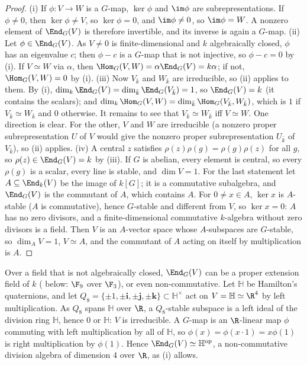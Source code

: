 \begin{proof}
(i) If $\phi\colon V\to W$ is a $G$-map, $\ker\phi$ and $\im\phi$ are subrepresentations. If $\phi\ne0$, then $\ker\phi\ne V$, so $\ker\phi=0$, and
$\im\phi\ne0$, so $\im\phi=W$. A nonzero element of $\End_G(V)$ is therefore invertible, and its inverse is again a $G$-map.
(ii) Let $\phi\in\End_G(V)$. As $V\ne0$ is finite-dimensional and $k$ algebraically closed, $\phi$ has an eigenvalue $c$; then $\phi-c$ is a
$G$-map that is not injective, so $\phi-c=0$ by (i). If $V\simeq W$ via $\alpha$, then $\Hom_G(V,W)=\alpha\End_G(V)=k\alpha$; if not, $\Hom_G(V,W)=0$
by (i).
(iii) Now $V_{\bar k}$ and $W_{\bar k}$ are irreducible, so (ii) applies to them. By (i),
$\dim_k\End_G(V)=\dim_{\bar k}\End_G(V_{\bar k})=1$, so $\End_G(V)=k$ (it contains the scalars); and $\dim_k\Hom_G(V,W)=\dim_{\bar k}\Hom_G(V_{\bar k},W_{\bar k})$, which
is $1$ if $V_{\bar k}\simeq W_{\bar k}$ and $0$ otherwise. It remains to see that $V_{\bar k}\simeq W_{\bar k}$ iff $V\simeq W$. One direction is clear. For the
other, $V$ and $W$ are irreducible (a nonzero proper subrepresentation $U$ of $V$ would give the nonzero proper subrepresentation $U_{\bar k}$
of $V_{\bar k}$), so (ii) applies.
(iv) A central $z$ satisfies $\rho(z)\rho(g)=\rho(g)\rho(z)$ for all $g$, so $\rho(z)\in\End_G(V)=k$ by (iii). If $G$ is abelian, every element is
central, so every $\rho(g)$ is a scalar, every line is stable, and $\dim V=1$. For the last statement let $A\subseteq\End_k(V)$ be the image of $k[G]$; it is a commutative subalgebra, and
$\End_G(V)$ is the commutant of $A$, which contains $A$. For $0\ne x\in A$, $\ker x$ is $A$-stable ($A$ is commutative), hence $G$-stable
and different from $V$, so $\ker x=0$: $A$ has no zero divisors, and a finite-dimensional commutative $k$-algebra without zero
divisors is a field. Then $V$ is an $A$-vector space whose $A$-subspaces are $G$-stable, so $\dim_AV=1$, $V\simeq A$, and the commutant
of $A$ acting on itself by multiplication is $A$.
\end{proof}

Over a field that is not algebraically closed, $\End_G(V)$ can be a proper extension field of $k$ ( below: $\F_9$ over
$\F_3$), or even non-commutative. Let $\mathbb H$ be Hamilton's quaternions, and let $Q_8=\{\pm1,\pm\mathbf i,\pm\mathbf j,\pm\mathbf k\}\subset\mathbb H^\times$ act on
$V=\mathbb H\simeq\R^4$ by left multiplication. As $Q_8$ spans $\mathbb H$ over $\R$, a $Q_8$-stable subspace is a left ideal of the division ring
$\mathbb H$, hence $0$ or $\mathbb H$: $V$ is irreducible. A $G$-map is an $\R$-linear map $\phi$ commuting with left multiplication by all of $\mathbb H$,
so $\phi(x)=\phi(x\cdot1)=x\phi(1)$ is right multiplication by $\phi(1)$. Hence $\End_G(V)\simeq\mathbb H^{\mathrm{op}}$, a non-commutative division algebra
of dimension $4$ over $\R$, as (i) allows.

